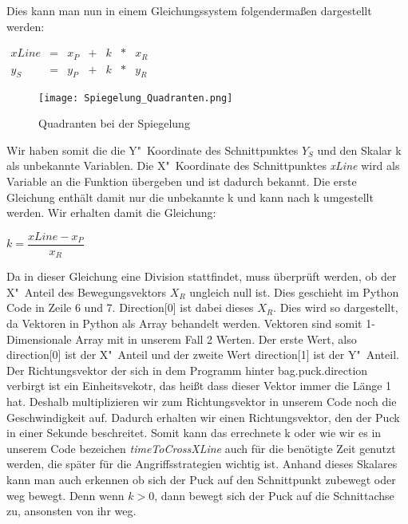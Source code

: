 Dies kann man nun in einem Gleichungssystem folgendermaßen dargestellt werden: 

$
\begin{array}{ccccccc}
xLine & = & x_P & + & k & * & x_R \\
y_S & = & y_P & + & k & * & y_R
\end{array}
$ 

\begin{wrapfigure}{R}{0pt}
	\vspace{-15pt}
	\texttt{[image: Spiegelung\_Quadranten.png]}
	\vspace{-15pt}
	\caption{Quadranten bei der Spiegelung}
	\vspace{-15pt}
	\label{img:Quadranten}
\end{wrapfigure}

Wir haben somit die die Y"~Koordinate des Schnittpunktes $Y_S$ und den Skalar k als unbekannte Variablen. Die X"~Koordinate des Schnittpunktes \textit{xLine} wird als Variable an die Funktion übergeben und ist dadurch bekannt. Die erste Gleichung enthält damit nur die unbekannte k und kann nach k umgestellt werden. Wir erhalten damit die Gleichung: 

$k = \dfrac{xLine - x_P}{x_R}$

Da in dieser Gleichung eine Division stattfindet, muss überprüft werden, ob der X"~Anteil des Bewegungsvektors $X_R$ ungleich null ist. Dies geschieht im Python Code in Zeile 6 und 7. Direction[0] ist dabei dieses $X_R$. Dies wird so dargestellt, da Vektoren in Python als Array behandelt werden. Vektoren sind somit 1-Dimensionale Array mit in unserem Fall 2 Werten. Der erste Wert, also direction[0] ist der X"~Anteil und der zweite Wert direction[1] ist der Y"~Anteil. Der Richtungsvektor der sich in dem Programm hinter bag.puck.direction verbirgt ist ein Einheitsvekotr, das heißt dass dieser Vektor immer die Länge 1 hat. Deshalb multiplizieren wir zum Richtungsvektor in unserem Code noch die Geschwindigkeit auf. Dadurch erhalten wir einen Richtungsvektor, den der Puck in einer Sekunde beschreitet. Somit kann das errechnete k oder wie wir es in unserem Code bezeichen \textit{timeToCrossXLine} auch für die benötigte Zeit genutzt werden, die später für die Angriffsstrategien wichtig ist. Anhand dieses Skalares kann man auch erkennen ob sich der Puck auf den Schnittpunkt zubewegt oder weg bewegt. Denn wenn $k>0$, dann bewegt sich der Puck auf die Schnittachse zu, ansonsten von ihr weg. 

